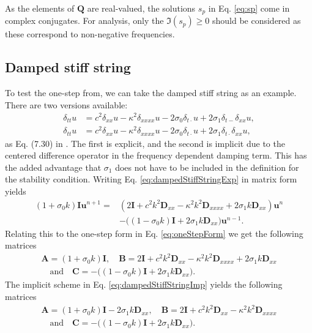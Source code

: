 \documentclass{article}
\def\u{\mathbf{u}}
\def\I{\mathbf{I}}
\def\A{\mathbf{A}}
\def\B{\mathbf{B}}
\def\C{\mathbf{C}}
\def\Q{\mathbf{Q}}
\def\Dxx{\mathbf{D}_{xx}}
\def\Dxxxx{\mathbf{D}_{xxxx}}
\begin{document}
As the elements of $\Q$ are real-valued, the solutions $s_p$ in Eq. \eqref{eq:sp} come in complex conjugates. For analysis, only the $\mathfrak{I}(s_p)\geq 0$ should be considered as these correspond to non-negative frequencies.

\subsection{Damped stiff string}
To test the one-step from, we can take the damped stiff string as an example. There are two versions available:
\begin{subequations}
    \begin{align}
        \delta_{tt}u &= c^2\delta_{xx}u - \kappa^2\delta_{xxxx}u - 2\sigma_0\delta_{t\cdot}u + 2\sigma_1\delta_{t-}\delta_{xx}u,\label{eq:dampedStiffStringExp}\\
        \delta_{tt}u &= c^2\delta_{xx}u - \kappa^2\delta_{xxxx}u - 2\sigma_0\delta_{t\cdot}u + 2\sigma_1\delta_{t\cdot}\delta_{xx}u\label{eq:dampedStiffStringImp},
    \end{align}
\end{subequations}
as Eq. (7.30) in \cite{Bilbao2009}. The first is explicit, and the second is implicit due to the centered difference operator in the frequency dependent damping term. This has the added advantage that $\sigma_1$ does not have to be included in the definition for the stability condition. Writing Eq. \eqref{eq:dampedStiffStringExp} in matrix form yields
\begin{equation}
    \begin{aligned}
        (1+\sigma_0k)\I \u^{n+1} =& \left(2\I + c^2k^2\Dxx -\kappa^2k^2\Dxxxx + 2\sigma_1k\Dxx\right)\u^n\\
    &- \big((1-\sigma_0k)\I+2\sigma_1k\Dxx\big)\u^{n-1}.
    \end{aligned}
\end{equation}
Relating this to the one-step form in Eq. \eqref{eq:oneStepForm} we get the following matrices
\begin{equation}
    \begin{gathered}
        \A = (1+\sigma_0k)\I, \quad \B =2\I + c^2k^2\Dxx -\kappa^2k^2\Dxxxx + 2\sigma_1k\Dxx \\
        \quad \text{and} \quad \C = - \big((1-\sigma_0k)\I+2\sigma_1k\Dxx\big).
    \end{gathered}
\end{equation}
The implicit scheme in Eq. \eqref{eq:dampedStiffStringImp} yields the following matrices
\begin{equation}
    \begin{gathered}
        \A = (1+\sigma_0k)\I - 2\sigma_1k\Dxx, \quad \B =2\I + c^2k^2\Dxx -\kappa^2k^2\Dxxxx \\
        \quad \text{and} \quad \C = - \big((1-\sigma_0k)\I+2\sigma_1k\Dxx\big).
    \end{gathered}
\end{equation}
\end{document}
